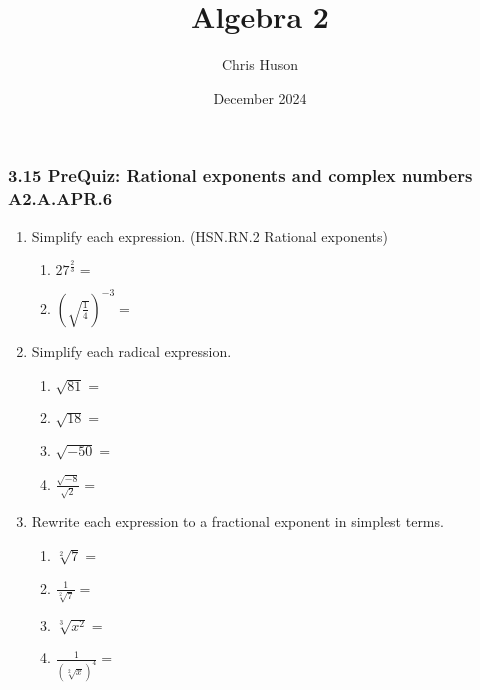 \documentclass[12pt, twoside]{article}
\title{Algebra 2}
\author{Chris Huson}
\date{December 2024}
\begin{document}
\subsubsection*{3.15 PreQuiz: Rational exponents and complex numbers \hfill A2.A.APR.6}
\begin{enumerate}[itemsep=0.5cm]


\item Simplify each expression. \hfill (HSN.RN.2 Rational exponents)
    \begin{multicols}{2}
    \begin{enumerate}[itemsep=0.5cm]
        \item $\displaystyle 27^{\frac{2}{3}} =$
        \item $\left( \sqrt{\frac{1}{4}} \right)^{-3} =$
    \end{enumerate}
    \end{multicols} \vspace{2cm}

\item Simplify each radical expression.
    \begin{multicols}{2}
    \begin{enumerate}[itemsep=0.5cm]
        \item $\sqrt{81}=$
        \item $\sqrt{18}=$
        \item $\sqrt{-50}=$
        \item $\displaystyle \frac{\sqrt{-8}}{\sqrt{2}}=$
    \end{enumerate}
    \end{multicols} \vspace{1cm}
    
\item Rewrite each expression to a fractional exponent in simplest terms.
    \begin{multicols}{2}
      \begin{enumerate}[itemsep=1cm]
          \item $\sqrt[2]{7} =$
          \item $\displaystyle \frac{1}{\sqrt[2]{7}}=$
          \item $\sqrt[3]{x^2} =$
          \item $\displaystyle \frac{1}{(\sqrt[2]{x})^4}=$
      \end{enumerate}
      \end{multicols} \vspace{1cm}
  

\end{enumerate}
\end{document}
